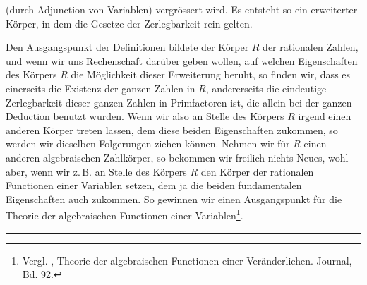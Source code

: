 (durch Adjunction von Variablen) vergrössert wird. Es entsteht so ein erweiterter Körper, in dem die Gesetze der Zerlegbarkeit rein gelten.

Den Ausgangspunkt der Definitionen bildete der Körper $R$ der rationalen Zahlen, und wenn wir uns Rechenschaft darüber geben wollen, auf welchen Eigenschaften des Körpers $R$ die Möglichkeit dieser Erweiterung beruht, so finden wir, dass es einerseits die Existenz der ganzen Zahlen in $R$, andererseits die eindeutige Zerlegbarkeit dieser ganzen Zahlen in Primfactoren ist, die allein bei der ganzen Deduction benutzt wurden. Wenn wir also an Stelle des Körpers $R$ irgend einen anderen Körper treten lassen, dem diese beiden Eigenschaften zukommen, so werden wir dieselben Folgerungen ziehen können. Nehmen wir für $R$ einen anderen algebraischen Zahlkörper, so bekommen wir freilich nichts Neues, wohl aber, wenn wir z.\,B. an Stelle des Körpers $R$ den Körper der rationalen Functionen einer Variablen setzen, dem ja die beiden fundamentalen Eigenschaften auch zukommen. So gewinnen wir einen Ausgangspunkt für die Theorie der algebraischen Functionen einer Variablen\footnote{Vergl. , Theorie der algebraischen Functionen einer Veränderlichen.  Journal, Bd. 92.}.

\begin{center}
\rule{4cm}{0.4pt}
\end{center}
